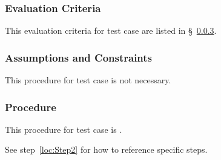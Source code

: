 \subsubsection{Evaluation Criteria}
\label{loc:TestCaseEvaluationCriteria\StsTestSpecID\StsTestCaseID}


This evaluation criteria for test \StsTestSpecID{} case \StsTestCaseID{} are listed in \S~\ref{loc:TestCaseProcedure\StsTestSpecID\StsTestCaseID}.

\subsubsection{Assumptions and Constraints}
\label{loc:TestCaseAssumptions\StsTestSpecID\StsTestCaseID}


This procedure for test \StsTestSpecID{} case \StsTestCaseID{} is not necessary.

\subsubsection{Procedure}
\label{loc:TestCaseProcedure\StsTestSpecID\StsTestCaseID}


This procedure for test \StsTestSpecID{} case \StsTestCaseID{} is \TBD.

See step~\ref{loc:Step2} for how to reference specific steps.


